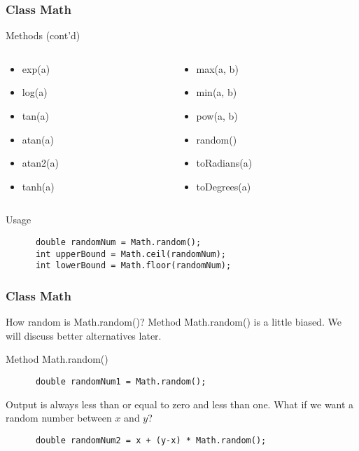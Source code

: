 \documentclass[10pt, compress]{beamer}
\begin{document}
\begin{frame}[fragile]
  \frametitle{Class Math}
  \begin{block}{Methods (cont'd)}
    \begin{columns}
      \begin{column}{0.5\textwidth}
        \begin{itemize}
          \item[] exp(a)
          \item[] log(a)
          \item[] tan(a)
          \item[] atan(a)
          \item[] atan2(a)
          \item[] tanh(a)
        \end{itemize}
      \end{column}
      \begin{column}{0.5\textwidth}
        \begin{itemize}
          \item[] max(a, b)
          \item[] min(a, b)
          \item[] pow(a, b)
          \item[] random()
          \item[] toRadians(a)
          \item[] toDegrees(a)
        \end{itemize}
      \end{column}
    \end{columns}
  \end{block}
  \begin{block}{Usage}
    \begin{verbatim}
      double randomNum = Math.random();
      int upperBound = Math.ceil(randomNum);
      int lowerBound = Math.floor(randomNum);
    \end{verbatim}
  \end{block}
\end{frame}

\begin{frame}[fragile]
  \frametitle{Class Math}
  \begin{block}{How random is Math.random()?}
    Method Math.random() is a little biased. We will discuss better alternatives later.
  \end{block}
  \begin{block}{Method Math.random()}
    \begin{verbatim}
      double randomNum1 = Math.random();
    \end{verbatim}
    Output is always less than or equal to zero and less than one. What if we want a random number between $x$ and $y$?
    \begin{verbatim}
      double randomNum2 = x + (y-x) * Math.random();
    \end{verbatim}
  \end{block}
\end{frame}
\end{document}
